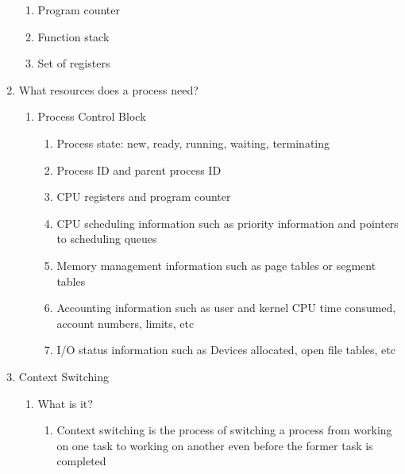 \documentclass [12pt, executivepaper]{article}
\begin{document}
\begin{enumerate}
\begin{enumerate}
\item Program counter

\item Function stack

\item Set of registers

\end{enumerate}

\item What resources does a process need?

\begin{enumerate}

\item Process Control Block

\begin{enumerate}

\item Process state: new, ready, running, waiting, terminating

\item Process ID and parent process ID

\item CPU registers and program counter

\item CPU scheduling information such as priority information and pointers to scheduling queues

\item Memory management information such as page tables or segment tables 

\item Accounting information such as user and kernel CPU time consumed, account numbers, limits, etc

\item I/O status information such as Devices allocated, open file tables, etc

\end{enumerate}

\end{enumerate}

\item Context Switching

\begin{enumerate}

\item What is it?

\begin{enumerate}

\item Context switching is the process of switching a process from working on one task to working on another even before the former task is completed


\end{enumerate}
\end{enumerate}
\end{enumerate}
\end{document}

